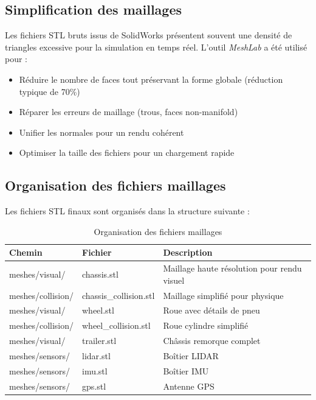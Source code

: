 \documentclass[a4paper,12pt]{report}
\begin{document}
\subsection{Simplification des maillages}

Les fichiers STL bruts issus de SolidWorks présentent souvent une densité de triangles excessive pour la simulation en temps réel. L'outil \textit{MeshLab} a été utilisé pour :

\begin{itemize}
    \item Réduire le nombre de faces tout préservant la forme globale (réduction typique de 70\%)
    \item Réparer les erreurs de maillage (trous, faces non-manifold)
    \item Unifier les normales pour un rendu cohérent
    \item Optimiser la taille des fichiers pour un chargement rapide
\end{itemize}

\subsection{Organisation des fichiers maillages}

Les fichiers STL finaux sont organisés dans la structure suivante :

\begin{table}[htbp]
\centering
\caption{Organisation des fichiers maillages}
\begin{tabular}{@{}llp{7cm}@{}}
\toprule
\textbf{Chemin} & \textbf{Fichier} & \textbf{Description} \\
\midrule
meshes/visual/ & chassis.stl & Maillage haute résolution pour rendu visuel \\
meshes/collision/ & chassis\_collision.stl & Maillage simplifié pour physique \\
meshes/visual/ & wheel.stl & Roue avec détails de pneu \\
meshes/collision/ & wheel\_collision.stl & Roue cylindre simplifié \\
meshes/visual/ & trailer.stl & Châssis remorque complet \\
meshes/sensors/ & lidar.stl & Boîtier LIDAR \\
meshes/sensors/ & imu.stl & Boîtier IMU \\
meshes/sensors/ & gps.stl & Antenne GPS \\
\bottomrule
\end{tabular}
\end{table}
\end{document}
